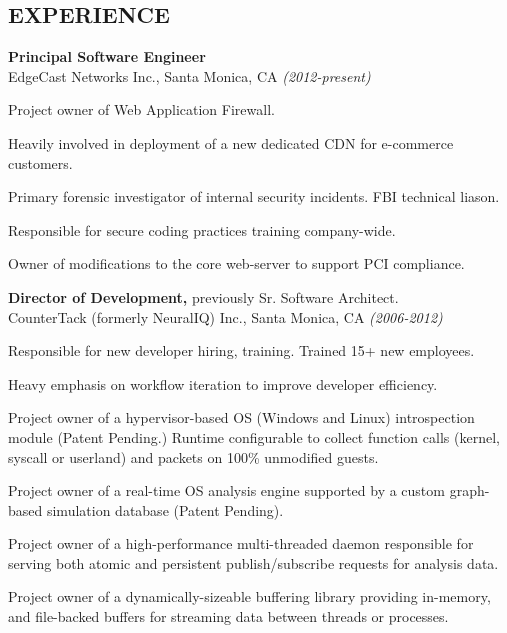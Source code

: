 \documentclass[margin]{res}
\begin{document}
\begin{resume}
\section{EXPERIENCE}
\noindent
{\bf Principal Software Engineer} \\ 
EdgeCast Networks Inc., Santa Monica, CA {\em (2012-present)}
\begin{list}{}{\leftmargin=1.5em \topsep=5pt \partopsep=0pt \parsep=2.5pt}
  \item Project owner of Web Application Firewall.
  \item Heavily involved in deployment of a new dedicated CDN for 
    e-commerce customers.
  \item Primary forensic investigator of internal security incidents.  
    FBI technical liason.
  \item Responsible for secure coding practices training company-wide.
  \item Owner of modifications to the core web-server to support PCI 
    compliance.
\end{list}

{\bf Director of Development,} previously Sr. Software Architect. \\ 
CounterTack (formerly NeuralIQ) Inc., Santa Monica, CA {\em (2006-2012)}
\begin{list}{}{\leftmargin=1.5em \topsep=5pt \partopsep=0pt \parsep=2.5pt}
  \item Responsible for new developer hiring, training.  Trained 15+ 
    new employees.
  \item Heavy emphasis on workflow iteration to improve developer 
    efficiency.
  \item Project owner of a hypervisor-based OS (Windows and Linux)
    introspection module (Patent Pending.)  Runtime configurable to
    collect function calls (kernel, syscall or userland) and packets
    on 100\% unmodified guests.
  \item Project owner of a real-time OS analysis engine supported by a
    custom graph-based simulation database (Patent Pending).
  \item Project owner of a high-performance multi-threaded daemon
    responsible for serving both atomic and persistent
    publish/subscribe requests for analysis data.
  \item Project owner of a dynamically-sizeable buffering library
    providing in-memory, and file-backed buffers for streaming
    data between threads or processes.
\end{list}


\end{resume}
\end{document}

